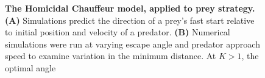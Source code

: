 \documentclass[12pt]{article}
\begin{document}
\begin{figure}[t!]
\begin{centering}
\centering	
\caption{\textbf{The Homicidal Chauffeur model, applied to prey strategy.} \textbf{(A)} Simulations predict the direction of a prey's fast start relative to initial position and velocity of a predator. \textbf{(B)} Numerical simulations were run at varying escape angle and predator approach speed to examine variation in the minimum distance. At $K>1$, the optimal angle }
\label{weihs_topo}
\end{centering}
\end{figure}

\pagebreak
\end{document}
